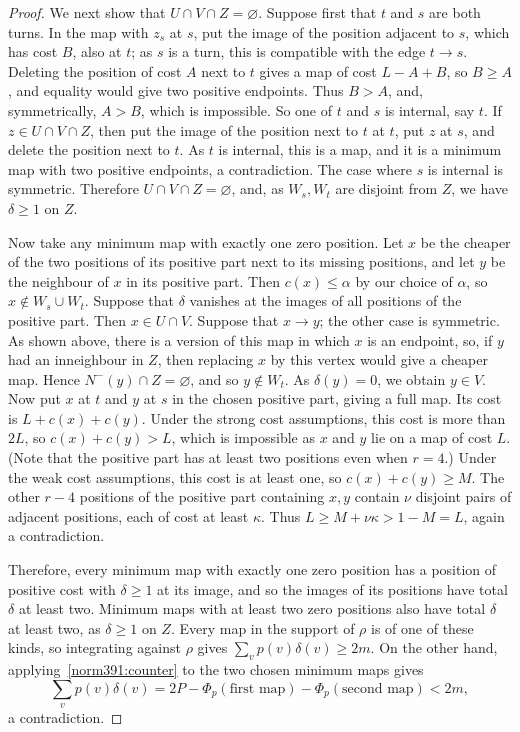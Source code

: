 \begin{proof}
We next show that $U\cap V\cap Z=\varnothing$. Suppose first that $t$ and $s$ are both turns. In the map with $z_s$ at $s$, put the image of the position adjacent to $s$, which has cost $B$, also at $t$; as $s$ is a turn, this is compatible with the edge $t\to s$. Deleting the position of cost $A$ next to $t$ gives a map of cost $L-A+B$, so $B\ge A$, and equality would give two positive endpoints. Thus $B>A$, and, symmetrically, $A>B$, which is impossible. So one of $t$ and $s$ is internal, say $t$. If $z\in U\cap V\cap Z$, then put the image of the position next to $t$ at $t$, put $z$ at $s$, and delete the position next to $t$. As $t$ is internal, this is a map, and it is a minimum map with two positive endpoints, a contradiction. The case where $s$ is internal is symmetric. Therefore $U\cap V\cap Z=\varnothing$, and, as $W_s,W_t$ are disjoint from $Z$, we have $\delta\ge1$ on $Z$.

Now take any minimum map with exactly one zero position. Let $x$ be the cheaper of the two positions of its positive part next to its missing positions, and let $y$ be the neighbour of $x$ in its positive part. Then $c(x)\le\alpha$ by our choice of $\alpha$, so $x\notin W_s\cup W_t$.
Suppose that $\delta$ vanishes at the images of all positions of the positive part. Then $x\in U\cap V$. Suppose that $x\to y$; the other case is symmetric. As shown above, there is a version of this map in which $x$ is an endpoint, so, if $y$ had an inneighbour in $Z$, then replacing $x$ by this vertex would give a cheaper map. Hence $N^-(y)\cap Z=\varnothing$, and so $y\notin W_t$. As $\delta(y)=0$, we obtain $y\in V$. Now put $x$ at $t$ and $y$ at $s$ in the chosen positive part, giving a full map. Its cost is $L+c(x)+c(y)$.
Under the strong cost assumptions, this cost is more than $2L$, so $c(x)+c(y)>L$, which is impossible as $x$ and $y$ lie on a map of cost $L$. (Note that the positive part has at least two positions even when $r=4$.)
Under the weak cost assumptions, this cost is at least one, so $c(x)+c(y)\ge M$. The other $r-4$ positions of the positive part containing $x,y$ contain $\nu$ disjoint pairs of adjacent positions, each of cost at least $\kappa$. Thus $L\ge M+\nu\kappa>1-M=L$, again a contradiction.

Therefore, every minimum map with exactly one zero position has a position of positive cost with $\delta\ge1$ at its image, and so the images of its positions have total $\delta$ at least two. Minimum maps with at least two zero positions also have total $\delta$ at least two, as $\delta\ge1$ on $Z$. Every map in the support of $\rho$ is of one of these kinds, so integrating against $\rho$ gives $\sum_vp(v)\delta(v)\ge2m$. On the other hand, applying~\eqref{norm391:counter} to the two chosen minimum maps gives
\[
\sum_vp(v)\delta(v)=2P-\Phi_p(\text{first map})-\Phi_p(\text{second map})<2m,
\]
a contradiction.


\end{proof}
